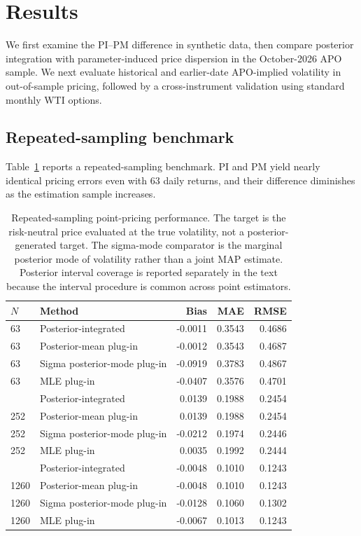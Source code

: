 \section{Results}\label{sec:results}

We first examine the PI--PM difference in synthetic data, then compare posterior integration with parameter-induced price dispersion in the October-2026 APO sample. We next evaluate historical and earlier-date APO-implied volatility in out-of-sample pricing, followed by a cross-instrument validation using standard monthly WTI options.

\subsection{Repeated-sampling benchmark}

Table~\ref{tab:synthetic_pilot} reports a repeated-sampling benchmark. PI and PM yield nearly identical pricing errors even with 63 daily returns, and their difference diminishes as the estimation sample increases.

\begin{table}[t]
\centering
\caption{Repeated-sampling point-pricing performance. The target is the risk-neutral price evaluated at the true volatility, not a posterior-generated target. The sigma-mode comparator is the marginal posterior mode of volatility rather than a joint MAP estimate. Posterior interval coverage is reported separately in the text because the interval procedure is common across point estimators.}\label{tab:synthetic_pilot}
\begin{tabular}{llrrr}
\toprule
$N$ & Method & Bias & MAE & RMSE\\
\midrule
63 & Posterior-integrated & -0.0011 & 0.3543 & 0.4686\\
63 & Posterior-mean plug-in & -0.0012 & 0.3543 & 0.4687\\
63 & Sigma posterior-mode plug-in & -0.0919 & 0.3783 & 0.4867\\
63 & MLE plug-in & -0.0407 & 0.3576 & 0.4701\\
\addlinespace
252 & Posterior-integrated & 0.0139 & 0.1988 & 0.2454\\
252 & Posterior-mean plug-in & 0.0139 & 0.1988 & 0.2454\\
252 & Sigma posterior-mode plug-in & -0.0212 & 0.1974 & 0.2446\\
252 & MLE plug-in & 0.0035 & 0.1992 & 0.2444\\
\addlinespace
1260 & Posterior-integrated & -0.0048 & 0.1010 & 0.1243\\
1260 & Posterior-mean plug-in & -0.0048 & 0.1010 & 0.1243\\
1260 & Sigma posterior-mode plug-in & -0.0128 & 0.1060 & 0.1302\\
1260 & MLE plug-in & -0.0067 & 0.1013 & 0.1243\\
\bottomrule
\end{tabular}
\end{table}

